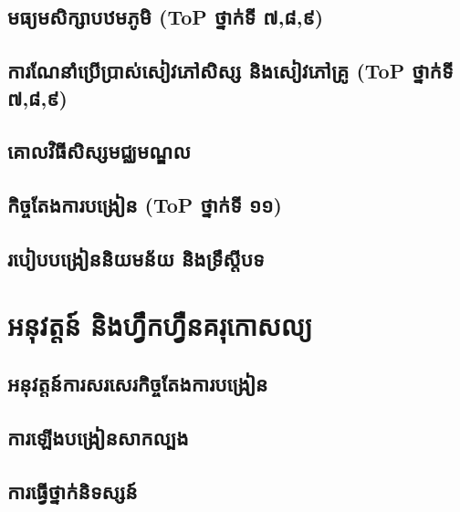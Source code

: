 \documentclass[a4paper,12pt,blue]{pptec}
\begin{document}
	\section*{មធ្យមសិក្សាបឋមភូមិ (ToP ថ្នាក់ទី ៧,៨,៩)}
	\section{ការណែនាំប្រើប្រាស់សៀវភៅសិស្ស និងសៀវភៅគ្រូ (ToP ថ្នាក់ទី ៧,៨,៩)}
	\section{គោលវិធីសិស្សមជ្ឈមណ្ឌល}
	\section{កិច្ចតែងការបង្រៀន (ToP ថ្នាក់ទី ១១)}
	\section{របៀបបង្រៀននិយមន័យ និងទ្រឹស្ដីបទ}
	\chapter{អនុវត្តន៍ និងហ្វឹកហ្វឺនគរុកោសល្យ}
	\section{អនុវត្តន៍ការសរសេរកិច្ចតែងការបង្រៀន}
	\section{ការឡើងបង្រៀនសាកល្បង}
	\section{ការធ្វើថ្នាក់និទស្សន៍}
\end{document}
